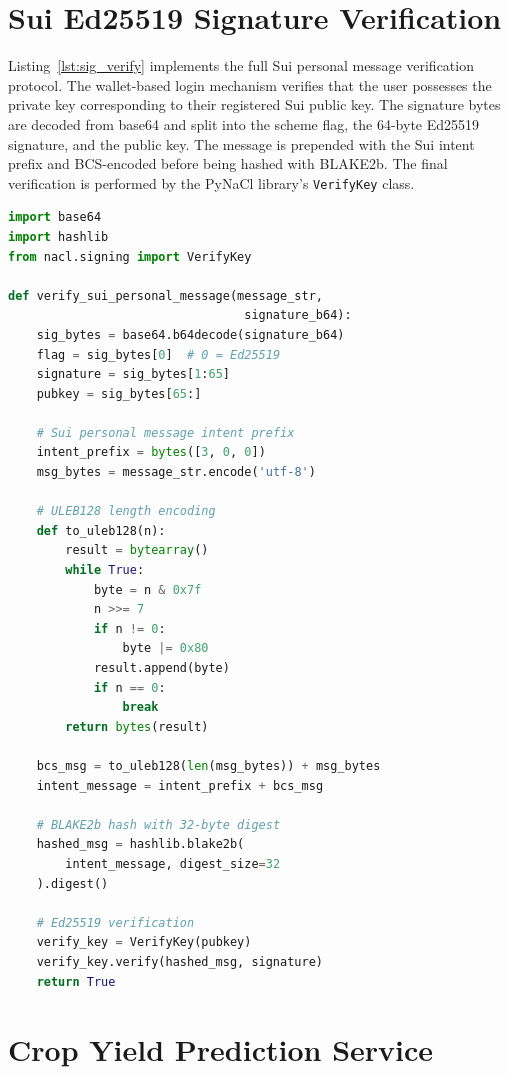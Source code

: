 \section{Sui Ed25519 Signature Verification}

Listing~\ref{lst:sig_verify} implements the full Sui personal message verification protocol. The wallet-based login mechanism verifies that the user possesses the private key corresponding to their registered Sui public key. The signature bytes are decoded from base64 and split into the scheme flag, the 64-byte Ed25519 signature, and the public key. The message is prepended with the Sui intent prefix and BCS-encoded before being hashed with BLAKE2b. The final verification is performed by the PyNaCl library's \texttt{VerifyKey} class.

\noindent\begin{minipage}{\textwidth}
\begin{lstlisting}[language=Python, caption={Sui Personal Message Signature Verification}, label={lst:sig_verify}]
import base64
import hashlib
from nacl.signing import VerifyKey

def verify_sui_personal_message(message_str,
                                 signature_b64):
    sig_bytes = base64.b64decode(signature_b64)
    flag = sig_bytes[0]  # 0 = Ed25519
    signature = sig_bytes[1:65]
    pubkey = sig_bytes[65:]

    # Sui personal message intent prefix
    intent_prefix = bytes([3, 0, 0])
    msg_bytes = message_str.encode('utf-8')

    # ULEB128 length encoding
    def to_uleb128(n):
        result = bytearray()
        while True:
            byte = n & 0x7f
            n >>= 7
            if n != 0:
                byte |= 0x80
            result.append(byte)
            if n == 0:
                break
        return bytes(result)

    bcs_msg = to_uleb128(len(msg_bytes)) + msg_bytes
    intent_message = intent_prefix + bcs_msg

    # BLAKE2b hash with 32-byte digest
    hashed_msg = hashlib.blake2b(
        intent_message, digest_size=32
    ).digest()

    # Ed25519 verification
    verify_key = VerifyKey(pubkey)
    verify_key.verify(hashed_msg, signature)
    return True
\end{lstlisting}
\end{minipage}

\section{Crop Yield Prediction Service}

